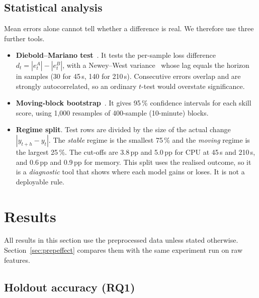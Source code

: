 \documentclass[conference]{IEEEtran}
\newcommand{\pp}{\,pp}
\begin{document}
\subsection{Statistical analysis}
Mean errors alone cannot tell whether a difference is real. We therefore use
three further tools.
\begin{itemize}
  \item \textbf{Diebold--Mariano test}~\cite{diebold1995dm}. It tests the
        per-sample loss difference $d_t=|e^{A}_t|-|e^{B}_t|$, with a
        Newey--West variance~\cite{newey1987hac} whose lag equals the horizon
        in samples (30 for 45\,s, 140 for 210\,s). Consecutive errors
        overlap and are strongly autocorrelated, so an ordinary $t$-test
        would overstate significance.
  \item \textbf{Moving-block bootstrap}~\cite{kunsch1989block}. It gives
        95\,\% confidence intervals for each skill score, using 1{,}000
        resamples of 400-sample (10-minute) blocks.
  \item \textbf{Regime split}. Test rows are divided by the size of the
        actual change $|y_{t+h}-y_t|$. The \emph{stable} regime is the
        smallest 75\,\% and the \emph{moving} regime is the largest
        25\,\%. The cut-offs are 3.8\pp{} and 5.0\pp{} for CPU at 45\,s and
        210\,s, and 0.6\pp{} and 0.9\pp{} for memory. This split uses the
        realised outcome, so it is a \emph{diagnostic} tool that shows where
        each model gains or loses. It is not a deployable rule.
\end{itemize}

\section{Results}\label{sec:results}
All results in this section use the preprocessed data unless stated
otherwise. Section~\ref{sec:prepeffect} compares them with the same
experiment run on raw features.

\subsection{Holdout accuracy (RQ1)}
\end{document}
